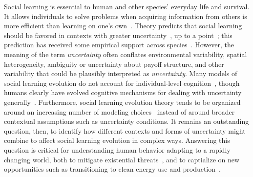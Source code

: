 \documentclass[letterpaper,11.5pt]{scrartcl}
\begin{document}
Social learning is essential to human and other species' everyday life and survival.
It allows individuals to solve problems when acquiring information from others is
more efficient than learning on one's own~\cite{Laland2004}. Theory predicts that
social learning should be favored in contexts with greater
uncertainty~\cite{BoydRicherson1985,Henrich1998}, up to a
point~\cite{Rogers1988,Feldman1996}; this prediction has received some empirical
support across species~\cite{McElreath2005,Kendal2018,Allen2019}.  However, the
meaning of the term \emph{uncertainty} often conflates environmental variability,
spatial heterogeneity, ambiguity or uncertainty about payoff structure, and other
variability that could be plausibly interpreted as \emph{uncertainty}.  Many models
of social learning evolution do not account for 
individual-level cognition~\cite{Heyes2016}, though humans
clearly have evolved cognitive mechanisms for dealing with 
uncertainty generally~\cite{Gershman2019,Schulz2019}.
Furthermore, social learning evolution theory tends to be organized around an
increasing number of modeling choices~\cite[Figure 1]{Kendal2018} instead
of around broader contextual assumptions such as uncertainty conditions. It remains
an outstanding question, then, to identify how different contexts and forms of
uncertainty might combine to affect social learning evolution in complex ways.
Answering this question is critical for understanding human behavior adapting to a
rapidly changing world, both to mitigate existential
threats~\cite{Moya2020,Jones2021}, and to captialize on new opportunities such as
transitioning to clean energy use and
production~\cite{NatureEnergyEditorialPromisesPremises2018,Brisbois2022}.
\end{document}

